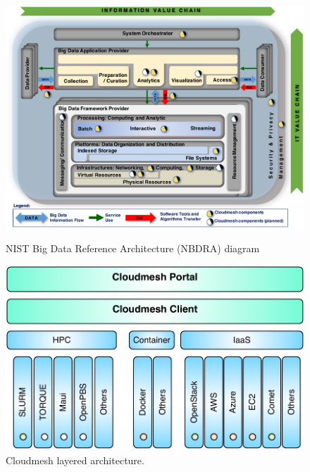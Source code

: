 \begin{figure}[hp]
  \centering
     \includegraphics[width=1.0\columnwidth]{images/nist-bda.pdf}
  \caption{NIST Big Data Reference Architecture (NBDRA) diagram} 
  \label{F:NIST-arch}

\bigskip
  \centering
     \includegraphics[width=1.0\columnwidth]{images/cloudmesh-arch-1.pdf}
  \caption{Cloudmesh layered architecture.} 
  \label{F:NIST-arch}
\bigskip


\end{figure}
